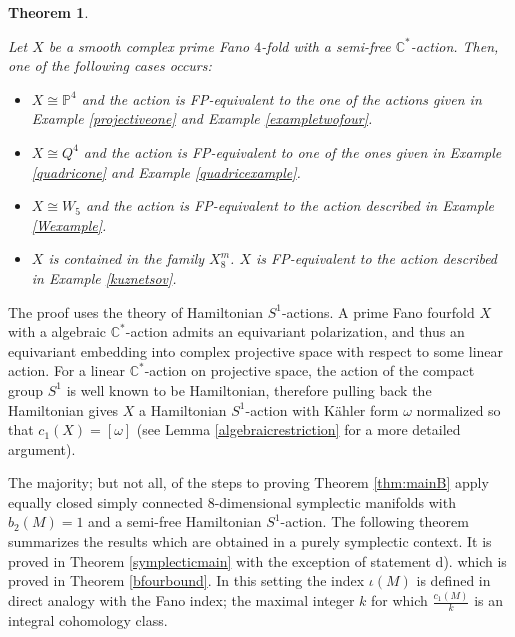 \documentclass[12pt]{article}
\newtheorem{mainthm}{Theorem}
\begin{document}
\begin{mainthm}  \label{thm:mainC} 

Let $X$ be a smooth complex prime Fano $4$-fold with a semi-free $\mathbb{C}^*$-action. Then, one of the following cases occurs: \begin{itemize}
\item[a).] $X \cong \mathbb{P}^4$ and the action is FP-equivalent to the one of the actions given in Example \ref{projectiveone} and Example \ref{exampletwofour}.
\item[b).] $X \cong Q^4$ and the action is FP-equivalent to one of the ones given in Example \ref{quadricone} and Example \ref{quadricexample}.
\item[c).] $X \cong W_5$ and the action is FP-equivalent to the action described in Example  \ref{Wexample}.

\item[d).] $X$ is contained in the family $ X^{m}_{8}$. $X$ is FP-equivalent to the action described in Example \ref{kuznetsov}.
\end{itemize}

\end{mainthm}

The proof uses the theory of Hamiltonian $S^1$-actions. A prime Fano fourfold $X$ with a algebraic $\mathbb{C}^*$-action admits an equivariant polarization, and thus an equivariant embedding into complex projective space with respect to some linear action. For a linear $\mathbb{C}^*$-action on projective space, the action of the compact group $S^1$ is well known to be Hamiltonian, therefore pulling back the Hamiltonian gives $X$ a Hamiltonian $S^1$-action with K\"{a}hler form $\omega$ normalized so that $c_{1}(X) = [\omega]$ (see Lemma \ref{algebraicrestriction} for a more detailed argument).

The majority; but not all, of the steps to proving Theorem \ref{thm:mainB} apply equally closed  simply connected $8$-dimensional symplectic manifolds with $b_{2}(M)=1$ and a semi-free Hamiltonian $S^1$-action. The following theorem summarizes the results which are obtained in a purely symplectic context. It is proved in Theorem \ref{symplecticmain} with the exception of statement d). which is proved in Theorem \ref{bfourbound}. In this setting the index $\iota(M)$ is defined in direct analogy with the Fano index; the maximal integer $k$ for which $\frac{c_1(M)}{k}$ is an integral cohomology class.
\end{document}
